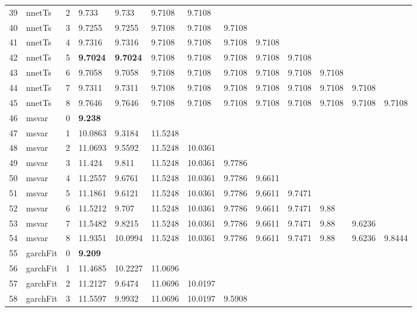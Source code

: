 \documentclass[10pt,a4paper]{article}
\begin{document}
\begin{table}[ht]
\begin{tabular}{rlrllllllllll}
  39 & nnetTs &     2 & 9.733 & 9.733 & 9.7108 & 9.7108 &  &  &  &  &  &  \\ 
  40 & nnetTs &     3 & 9.7255 & 9.7255 & 9.7108 & 9.7108 & 9.7108 &  &  &  &  &  \\ 
  41 & nnetTs &     4 & 9.7316 & 9.7316 & 9.7108 & 9.7108 & 9.7108 & 9.7108 &  &  &  &  \\ 
  42 & nnetTs &     5 & \textbf{9.7024} & \textbf{9.7024} & 9.7108 & 9.7108 & 9.7108 & 9.7108 & 9.7108 &  &  &  \\ 
  43 & nnetTs &     6 & 9.7058 & 9.7058 & 9.7108 & 9.7108 & 9.7108 & 9.7108 & 9.7108 & 9.7108 &  &  \\ 
  44 & nnetTs &     7 & 9.7311 & 9.7311 & 9.7108 & 9.7108 & 9.7108 & 9.7108 & 9.7108 & 9.7108 & 9.7108 &  \\ 
  45 & nnetTs &     8 & 9.7646 & 9.7646 & 9.7108 & 9.7108 & 9.7108 & 9.7108 & 9.7108 & 9.7108 & 9.7108 & 9.7108 \\ 
   \hline
46 & msvar &     0 & \textbf{9.238} &  &  &  &  &  &  &  &  &  \\ 
  47 & msvar &     1 & 10.0863 & 9.3184 & 11.5248 &  &  &  &  &  &  &  \\ 
  48 & msvar &     2 & 11.0693 & 9.5592 & 11.5248 & 10.0361 &  &  &  &  &  &  \\ 
  49 & msvar &     3 & 11.424 & 9.811 & 11.5248 & 10.0361 & 9.7786 &  &  &  &  &  \\ 
  50 & msvar &     4 & 11.2557 & 9.6761 & 11.5248 & 10.0361 & 9.7786 & 9.6611 &  &  &  &  \\ 
  51 & msvar &     5 & 11.1861 & 9.6121 & 11.5248 & 10.0361 & 9.7786 & 9.6611 & 9.7471 &  &  &  \\ 
  52 & msvar &     6 & 11.5212 & 9.707 & 11.5248 & 10.0361 & 9.7786 & 9.6611 & 9.7471 & 9.88 &  &  \\ 
  53 & msvar &     7 & 11.5482 & 9.8215 & 11.5248 & 10.0361 & 9.7786 & 9.6611 & 9.7471 & 9.88 & 9.6236 &  \\ 
  54 & msvar &     8 & 11.9351 & 10.0994 & 11.5248 & 10.0361 & 9.7786 & 9.6611 & 9.7471 & 9.88 & 9.6236 & 9.8444 \\ 
   \hline
55 & garchFit &     0 & \textbf{9.209} &  &  &  &  &  &  &  &  &  \\ 
  56 & garchFit &     1 & 11.4685 & 10.2227 & 11.0696 &  &  &  &  &  &  &  \\ 
  57 & garchFit &     2 & 11.2127 & 9.6474 & 11.0696 & 10.0197 &  &  &  &  &  &  \\ 
  58 & garchFit &     3 & 11.5597 & 9.9932 & 11.0696 & 10.0197 & 9.5908 &  &  &  &  &  \\ 

\end{tabular}
\end{table}
\end{document}
